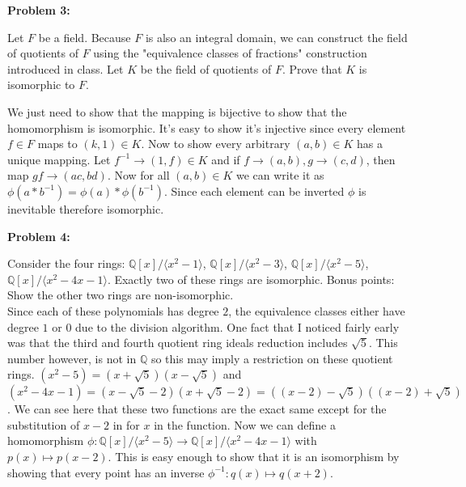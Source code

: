 \documentclass[letter paper, 12pt]{article}
\begin{document}
\noindent\textbf{Problem 3:}
    
     Let $F$ be a field. Because $F$ is also an integral domain, we can construct the field of quotients of $F$ using the "equivalence classes of fractions" construction introduced in class. Let $K$ be the field of quotients of $F$. Prove that $K$ is isomorphic to $F$.
    
    We just need to show that the mapping is bijective to show that the homomorphism is isomorphic. It's easy to show it's injective since every element $f\in F$ maps to $(k,1)\in K$. Now to show every arbitrary $(a,b)\in K$ has a unique mapping. Let $f^{-1} \rightarrow (1,f)\in K$ and if $f\rightarrow(a,b), g\rightarrow (c,d)$, then map $gf\rightarrow (ac,bd)$. Now for all $(a,b)\in K$ we can write it as $\phi(a*b^{-1})=\phi(a)*\phi(b^{-1})$. Since each element can be inverted $\phi$ is inevitable therefore isomorphic.
    
\noindent\textbf{Problem 4:}
    
    Consider the four rings: $\mathbb{Q}[x]/\langle x^2-1\rangle$, $\mathbb{Q}[x]/\langle x^2-3\rangle$, $\mathbb{Q}[x]/\langle x^2-5\rangle$, $\mathbb{Q}[x]/\langle x^2-4x-1\rangle$. Exactly two of these rings are isomorphic. Bonus points: Show the other two rings are non-isomorphic.\\
    
    Since each of these polynomials has degree $2$, the equivalence classes either have degree $1$ or $0$ due to the division algorithm. One fact that I noticed fairly early was that the third and fourth quotient ring ideals reduction includes $\sqrt{5}$. This number however, is not in $\mathbb{Q}$ so this may imply a restriction on these quotient rings. $(x^2-5)=(x+\sqrt{5})(x-\sqrt{5})$ and $(x^2-4x-1)=(x-\sqrt{5}-2)(x+\sqrt{5}-2)=((x-2)-\sqrt{5})((x-2)+\sqrt{5})$. We can see here that these two functions are the exact same except for the substitution of $x-2$ in for $x$ in the function. Now we can define a homomorphism $\phi: \mathbb{Q}[x]/\langle x^2-5\rangle \rightarrow \mathbb{Q}[x]/\langle x^2-4x-1\rangle$ with $p(x) \mapsto p(x-2)$. This is easy enough to show that it is an isomorphism by showing that every point has an inverse $\phi^{-1}:q(x)\mapsto q(x+2)$.
\end{document}

